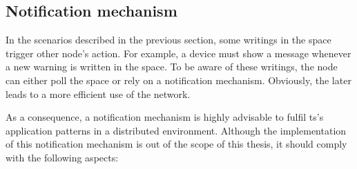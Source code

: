 \subsection{Notification mechanism}
\label{sec:notification}


In the scenarios described in the previous section, some writings in the space trigger other node's action.
For example, a device must show a message whenever a new warning is written in the space. %
To be aware of these writings, the node can either poll the space or rely on a notification mechanism. %
Obviously, the later leads to a more efficient use of the network. %


As a consequence, a notification mechanism is highly advisable to fulfil \ac{ts}'s application patterns in a distributed environment.
Although the implementation of this notification mechanism is out of the scope of this thesis,
it should comply with the following aspects:
